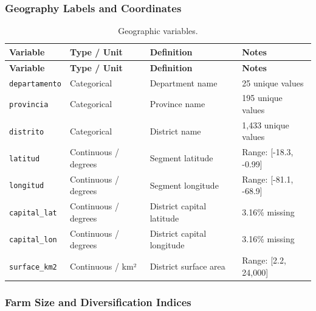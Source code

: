\documentclass[11pt,a4paper]{article}
\begin{document}
\subsubsection{Geography Labels and Coordinates}

\begin{longtable}{L{2.5cm}L{3cm}L{5cm}L{3.5cm}}
\caption{Geographic variables.} \\
\toprule
\textbf{Variable} & \textbf{Type / Unit} & \textbf{Definition} & \textbf{Notes} \\
\midrule
\endfirsthead
\toprule
\textbf{Variable} & \textbf{Type / Unit} & \textbf{Definition} & \textbf{Notes} \\
\midrule
\endhead
\bottomrule
\endlastfoot
\texttt{departamento} & Categorical & Department name & 25 unique values \\
\texttt{provincia} & Categorical & Province name & 195 unique values \\
\texttt{distrito} & Categorical & District name & 1,433 unique values \\
\texttt{latitud} & Continuous / degrees & Segment latitude & Range: [-18.3, -0.99] \\
\texttt{longitud} & Continuous / degrees & Segment longitude & Range: [-81.1, -68.9] \\
\texttt{capital\_lat} & Continuous / degrees & District capital latitude & 3.16\% missing \\
\texttt{capital\_lon} & Continuous / degrees & District capital longitude & 3.16\% missing \\
\texttt{surface\_km2} & Continuous / km² & District surface area & Range: [2.2, 24,000] \\
\end{longtable}

\subsubsection{Farm Size and Diversification Indices}
\end{document}
